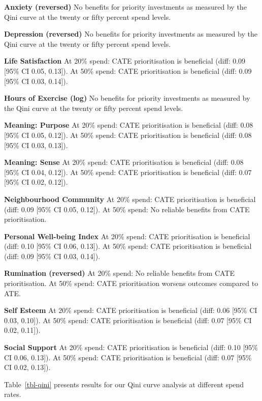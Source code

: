 \documentclass[
  single column]{article}
\begin{document}
\textbf{Anxiety (reversed)} No benefits for priority investments as
measured by the Qini curve at the twenty or fifty percent spend levels.

\textbf{Depression (reversed)} No benefits for priority investments as
measured by the Qini curve at the twenty or fifty percent spend levels.

\textbf{Life Satisfaction} At 20\% spend: CATE prioritisation is
beneficial (diff: 0.09 {[}95\% CI 0.05, 0.13{]}). At 50\% spend: CATE
prioritisation is beneficial (diff: 0.09 {[}95\% CI 0.03, 0.14{]}).

\textbf{Hours of Exercise (log)} No benefits for priority investments as
measured by the Qini curve at the twenty or fifty percent spend levels.

\textbf{Meaning: Purpose} At 20\% spend: CATE prioritisation is
beneficial (diff: 0.08 {[}95\% CI 0.05, 0.12{]}). At 50\% spend: CATE
prioritisation is beneficial (diff: 0.08 {[}95\% CI 0.03, 0.13{]}).

\textbf{Meaning: Sense} At 20\% spend: CATE prioritisation is beneficial
(diff: 0.08 {[}95\% CI 0.04, 0.12{]}). At 50\% spend: CATE
prioritisation is beneficial (diff: 0.07 {[}95\% CI 0.02, 0.12{]}).

\textbf{Neighbourhood Community} At 20\% spend: CATE prioritisation is
beneficial (diff: 0.09 {[}95\% CI 0.05, 0.12{]}). At 50\% spend: No
reliable benefits from CATE prioritisation.

\textbf{Personal Well-being Index} At 20\% spend: CATE prioritisation is
beneficial (diff: 0.10 {[}95\% CI 0.06, 0.13{]}). At 50\% spend: CATE
prioritisation is beneficial (diff: 0.09 {[}95\% CI 0.03, 0.14{]}).

\textbf{Rumination (reversed)} At 20\% spend: No reliable benefits from
CATE prioritisation. At 50\% spend: CATE prioritisation worsens outcomes
compared to ATE.

\textbf{Self Esteem} At 20\% spend: CATE prioritisation is beneficial
(diff: 0.06 {[}95\% CI 0.03, 0.10{]}). At 50\% spend: CATE
prioritisation is beneficial (diff: 0.07 {[}95\% CI 0.02, 0.11{]}).

\textbf{Social Support} At 20\% spend: CATE prioritisation is beneficial
(diff: 0.10 {[}95\% CI 0.06, 0.13{]}). At 50\% spend: CATE
prioritisation is beneficial (diff: 0.07 {[}95\% CI 0.02, 0.13{]}).

Table~\ref{tbl-qini} presents results for our Qini curve analysis at
different spend rates.
\end{document}
